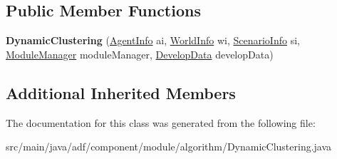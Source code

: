 \subsection*{Public Member Functions}
\begin{DoxyCompactItemize}
\item 
\hypertarget{classadf_1_1component_1_1module_1_1algorithm_1_1DynamicClustering_ab2d451e53f375755f489e976f3b98f30}{}\label{classadf_1_1component_1_1module_1_1algorithm_1_1DynamicClustering_ab2d451e53f375755f489e976f3b98f30} 
{\bfseries Dynamic\+Clustering} (\hyperlink{classadf_1_1agent_1_1info_1_1AgentInfo}{Agent\+Info} ai, \hyperlink{classadf_1_1agent_1_1info_1_1WorldInfo}{World\+Info} wi, \hyperlink{classadf_1_1agent_1_1info_1_1ScenarioInfo}{Scenario\+Info} si, \hyperlink{classadf_1_1agent_1_1module_1_1ModuleManager}{Module\+Manager} module\+Manager, \hyperlink{classadf_1_1agent_1_1develop_1_1DevelopData}{Develop\+Data} develop\+Data)
\end{DoxyCompactItemize}
\subsection*{Additional Inherited Members}


The documentation for this class was generated from the following file\+:\begin{DoxyCompactItemize}
\item 
src/main/java/adf/component/module/algorithm/Dynamic\+Clustering.\+java\end{DoxyCompactItemize}
